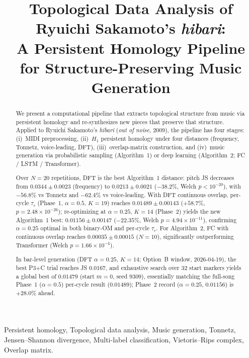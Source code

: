 \documentclass[conference,10pt,a4paper]{IEEEtran}
\title{Topological Data Analysis of Ryuichi Sakamoto's \emph{hibari}:\\
       A Persistent Homology Pipeline for Structure-Preserving Music Generation}
\author{\IEEEauthorblockN{Minju Kim}
\IEEEauthorblockA{Department of Mathematics\\
POSTECH (Pohang University of Science and Technology)\\
Pohang, Republic of Korea}
}
\begin{document}
\maketitle

\begin{abstract}
We present a computational pipeline that extracts topological structure
from music via persistent homology and re-synthesizes new pieces that
preserve that structure. Applied to Ryuichi Sakamoto's \emph{hibari}
(\emph{out of noise}, 2009), the pipeline has four stages:
(i)~MIDI preprocessing, (ii)~$H_1$ persistent homology under four
distances (frequency, Tonnetz, voice-leading, DFT), (iii)~overlap-matrix
construction, and (iv)~music generation via probabilistic sampling
(Algorithm~1) or deep learning (Algorithm~2; FC / LSTM / Transformer).

Over $N=20$ repetitions, DFT is the best Algorithm~1 distance:
pitch JS decreases from $0.0344 \pm 0.0023$ (frequency) to
$0.0213 \pm 0.0021$ ($-38.2\%$, Welch $p < 10^{-20}$), with
$-56.8\%$ vs Tonnetz and $-62.4\%$ vs voice-leading. With DFT continuous
overlap, per-cycle $\tau_c$ (Phase~1, $\alpha=0.5$, $K=19$) reaches
$0.01489 \pm 0.00143$ ($+58.7\%$, $p=2.48\times10^{-26}$); re-optimizing
at $\alpha=0.25$, $K=14$ (Phase~2) yields the new Algorithm~1 best:
$\mathbf{0.01156 \pm 0.00147}$ ($-22.35\%$, Welch $p=4.94\times10^{-11}$),
confirming $\alpha=0.25$ optimal in both binary-OM and per-cycle $\tau_c$.
For Algorithm~2, FC with continuous overlap reaches
$\mathbf{0.00035 \pm 0.00015}$ ($N=10$), significantly outperforming
Transformer (Welch $p = 1.66 \times 10^{-4}$).

In bar-level generation (DFT $\alpha=0.25$, $K=14$; Option~B window, 2026-04-19), the best
P3+C trial reaches JS $0.0167$, and exhaustive search over 32 start
markers yields a global best of $0.01479$ (start $m=0$, seed $9309$), essentially matching the
full-song Phase~1 ($\alpha=0.5$) per-cycle result ($0.01489$); Phase~2 record ($\alpha=0.25$, $0.01156$) is $+28.0\%$ ahead.
\end{abstract}

\begin{IEEEkeywords}
Persistent homology, Topological data analysis, Music generation,
Tonnetz, Jensen--Shannon divergence, Multi-label classification,
Vietoris--Rips complex, Overlap matrix.
\end{IEEEkeywords}
\end{document}
